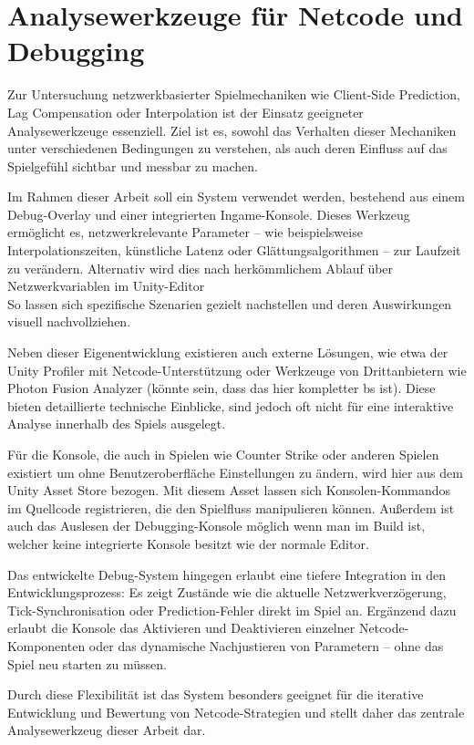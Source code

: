 \section{Analysewerkzeuge für Netcode und Debugging}
Zur Untersuchung netzwerkbasierter Spielmechaniken wie Client-Side Prediction, Lag Compensation oder Interpolation ist der Einsatz geeigneter Analysewerkzeuge essenziell. Ziel ist es, sowohl das Verhalten dieser Mechaniken unter verschiedenen Bedingungen zu verstehen, als auch deren Einfluss auf das Spielgefühl sichtbar und messbar zu machen.

Im Rahmen dieser Arbeit soll ein System verwendet werden, bestehend aus einem Debug-Overlay und einer integrierten Ingame-Konsole. Dieses Werkzeug ermöglicht es, netzwerkrelevante Parameter -- wie beispielsweise Interpolationszeiten, künstliche Latenz oder Glättungsalgorithmen -- zur Laufzeit zu verändern. Alternativ wird dies nach herkömmlichem Ablauf über Netzwerkvariablen im Unity-Editor  \\
So lassen sich spezifische Szenarien gezielt nachstellen und deren Auswirkungen visuell nachvollziehen.

Neben dieser Eigenentwicklung existieren auch externe Lösungen, wie etwa der Unity Profiler mit Netcode-Unterstützung oder Werkzeuge von Drittanbietern wie Photon Fusion Analyzer \cite{} (könnte sein, dass das hier kompletter bs ist). Diese bieten detaillierte technische Einblicke, sind jedoch oft nicht für eine interaktive Analyse innerhalb des Spiels ausgelegt.  

Für die Konsole, die auch in Spielen wie Counter Strike oder anderen Spielen existiert um ohne Benutzeroberfläche Einstellungen zu ändern, wird hier aus dem Unity Asset Store bezogen. \cite{}
Mit diesem Asset lassen sich Konsolen-Kommandos im Quellcode registrieren, die den Spielfluss manipulieren können. Außerdem ist auch das Auslesen der Debugging-Konsole möglich wenn man im Build ist, welcher keine integrierte Konsole besitzt wie der normale Editor.

Das entwickelte Debug-System hingegen erlaubt eine tiefere Integration in den Entwicklungsprozess: Es zeigt Zustände wie die aktuelle Netzwerkverzögerung, Tick-Synchronisation oder Prediction-Fehler direkt im Spiel an. Ergänzend dazu erlaubt die Konsole das Aktivieren und Deaktivieren einzelner Netcode-Komponenten oder das dynamische Nachjustieren von Parametern -- ohne das Spiel neu starten zu müssen.

Durch diese Flexibilität ist das System besonders geeignet für die iterative Entwicklung und Bewertung von Netcode-Strategien und stellt daher das zentrale Analysewerkzeug dieser Arbeit dar.



